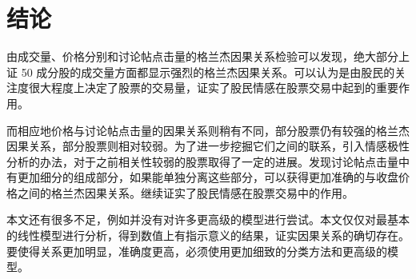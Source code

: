 \chapter{结论}

由成交量、价格分别和讨论帖点击量的格兰杰因果关系检验可以发现，绝大部分上证 50 成分股的成交量方面都显示强烈的格兰杰因果关系。可以认为是由股民的关注度很大程度上决定了股票的交易量，证实了股民情感在股票交易中起到的重要作用。

而相应地价格与讨论帖点击量的因果关系则稍有不同，部分股票仍有较强的格兰杰因果关系，部分股票则相对较弱。为了进一步挖掘它们之间的联系，引入情感极性分析的办法，对于之前相关性较弱的股票取得了一定的进展。发现讨论帖点击量中有更加细分的组成部分，如果能单独分离这些部分，可以获得更加准确的与收盘价格之间的格兰杰因果关系。继续证实了股民情感在股票交易中的作用。

本文还有很多不足，例如并没有对许多更高级的模型进行尝试。本文仅仅对最基本的线性模型进行分析，得到数值上有指示意义的结果，证实因果关系的确切存在。要使得关系更加明显，准确度更高，必须使用更加细致的分类方法和更高级的模型。

